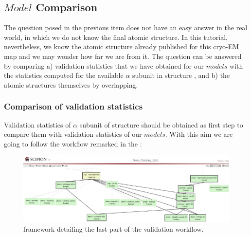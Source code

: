  \subsection*{$Model$ Comparison}
 
 The question posed in the previous item does not have an easy answer in the real world, in which we do not know the final atomic structure. In this tutorial, nevertheless, we know the atomic structure already published for this cryo-EM map and we may wonder how far we are from it. The question can be answered by comparing a) validation statistics that we have obtained for our $models$ with the statistics computed for the available $\alpha$ subunit in  structure , and b) the atomic structures themselves by overlapping.
    
  \subsubsection*{Comparison of validation statistics}
  
  Validation statistics of  $\alpha$ subunit of  structure  should be obtained as first step to compare them with validation statistics of our $models$. With this aim we are going to follow the workflow remarked in the :
  
  \begin{figure}[H]
  \centering 
  \captionsetup{width=.9\linewidth} 
  \includegraphics[width=1\textwidth]{Images/Fig72}
  \caption{\scipion framework detailing the last part of the validation workflow.}
  \label{fig:scipion_workflow_validation_2}
  \end{figure}
  
